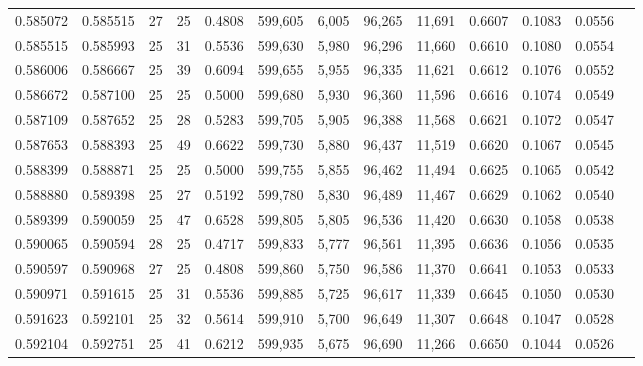 \begin{tabular}{rrrrrrrrrrrrr}
0.585072 & 0.585515 &    27 &  25 &                                     0.4808 & 599,605 &   6,005 &  96,265 &  11,691 & 0.6607 & 0.1083 & 0.0556 \\
0.585515 & 0.585993 &    25 &  31 &                                     0.5536 & 599,630 &   5,980 &  96,296 &  11,660 & 0.6610 & 0.1080 & 0.0554 \\
0.586006 & 0.586667 &    25 &  39 &                                     0.6094 & 599,655 &   5,955 &  96,335 &  11,621 & 0.6612 & 0.1076 & 0.0552 \\
0.586672 & 0.587100 &    25 &  25 &                                     0.5000 & 599,680 &   5,930 &  96,360 &  11,596 & 0.6616 & 0.1074 & 0.0549 \\
0.587109 & 0.587652 &    25 &  28 &                                     0.5283 & 599,705 &   5,905 &  96,388 &  11,568 & 0.6621 & 0.1072 & 0.0547 \\
0.587653 & 0.588393 &    25 &  49 &                                     0.6622 & 599,730 &   5,880 &  96,437 &  11,519 & 0.6620 & 0.1067 & 0.0545 \\
0.588399 & 0.588871 &    25 &  25 &                                     0.5000 & 599,755 &   5,855 &  96,462 &  11,494 & 0.6625 & 0.1065 & 0.0542 \\
0.588880 & 0.589398 &    25 &  27 &                                     0.5192 & 599,780 &   5,830 &  96,489 &  11,467 & 0.6629 & 0.1062 & 0.0540 \\
0.589399 & 0.590059 &    25 &  47 &                                     0.6528 & 599,805 &   5,805 &  96,536 &  11,420 & 0.6630 & 0.1058 & 0.0538 \\
0.590065 & 0.590594 &    28 &  25 &                                     0.4717 & 599,833 &   5,777 &  96,561 &  11,395 & 0.6636 & 0.1056 & 0.0535 \\
0.590597 & 0.590968 &    27 &  25 &                                     0.4808 & 599,860 &   5,750 &  96,586 &  11,370 & 0.6641 & 0.1053 & 0.0533 \\
0.590971 & 0.591615 &    25 &  31 &                                     0.5536 & 599,885 &   5,725 &  96,617 &  11,339 & 0.6645 & 0.1050 & 0.0530 \\
0.591623 & 0.592101 &    25 &  32 &                                     0.5614 & 599,910 &   5,700 &  96,649 &  11,307 & 0.6648 & 0.1047 & 0.0528 \\
0.592104 & 0.592751 &    25 &  41 &                                     0.6212 & 599,935 &   5,675 &  96,690 &  11,266 & 0.6650 & 0.1044 & 0.0526 \\

\end{tabular}
